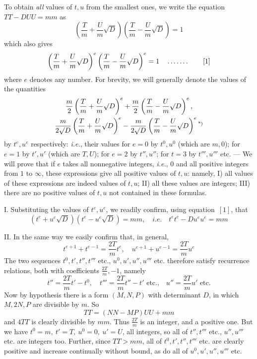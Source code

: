 To obtain \textit{all} values of \(t,u\) from the smallest ones, we write the equation \(TT-DUU=mm\) as
\[
\left(\frac{T}{m}+\frac{U}{m}\surd D\right)\left(\frac{T}{m}-\frac{U}{m}\surd D\right)=1
\]
which also gives
\[
\left(\frac{T}{m}+\frac{U}{m}\surd D\right)^e\left(\frac{T}{m}-\frac{U}{m}\surd D\right)^e=1\quad\mathinner{\ldotp\ldotp\ldotp\ldotp\ldotp\ldotp\ldotp}\tag*{[1]}
\]
where \(e\) denotes any number. For brevity, we will generally denote the values of the quantities
\begingroup{}
\[
\begin{gathered}\frac{m}{2}\left(\frac{T}{m}+\frac{U}{m}\surd D\right)^e+\frac{m}{2}\left(\frac{T}{m}-\frac{U}{m}\surd D\right)^e,\\
\frac{m}{2\surd D}\left(\frac{T}{m}+\frac{U}{m}\surd D\right)^e-\frac{m}{2\surd D}\left(\frac{T}{m}-\frac{U}{m}\surd D\right)^e\text{\textsuperscript{*)}}\end{gathered}
\]
\endgroup
by \(t^e,u^e\) respectively: \textit{i.e.}, their values for \(e=0\) by \(t^0,u^0\) (which are \(m,0\)); for \(e=1\) by \(t',u'\) (which are \(T,U\)); for \(e=2\) by \(t'',u''\); for \(t=3\) by \(t''',u'''\) etc. --- We will prove that if \(e\) takes all nonnegative integers, \textit{i.e.}, \(0\) and all positive integers from \(1\) to \(\infty\), these expressions give all positive values of \(t,u\): namely, I) all values of these expressions
are indeed values of \(t,u\); II) all these values are integers; III) there are no positive values of \(t,u\) not contained in these formulas.

I. Substituting the values of \(t^e,u^e\), we readily confirm, using equation~\([1]\), that
\[
(t^e+u^e\surd D)(t^e-u^e\surd D)=mm,\quad \textit{i.e.}\quad t^e t^e-Du^e u^e=mm
\]

II. In the same way we easily confirm that, in general,
\[
t^{e+1}+t^{e-1}=\frac{2T}{m}t^e,\quad u^{e+1}+u^{e-1}=\frac{2T}{m}u^e
\]
The two sequences \(t^0,t',t'',t'''\) etc., \(u^0,u',u'',u'''\) etc. therefore satisfy recurrence relations, both with coefficients \(\frac{2T}{m},-1\), namely
\[
t''=\frac{2T}{m}t'-t^0,\quad t'''=\frac{2T}{m}t''-t'\text{ etc.,}\quad u''=\frac{2T}{m}u'\text{ etc.}
\]
Now by hypothesis there is a form \((M,N,P)\) with determinant \(D\), in which \(M,2N,P\) are divisible by \(m\). So
\[
TT=(NN-MP)UU+mm
\]
and \(4TT\) is clearly divisible by \(mm\). Thus \(\frac{2T}{m}\) is an integer, and a positive one. But we have \(t^0=m,\ t'=T,\ u^0=0,\ u'=U\), all integers, so all of \(t'',t'''\) etc., \(u'',u'''\) etc. are integers too. Further, since \(TT>mm\), all of \(t^0,t',t'',t'''\) etc. are clearly positive and increase continually without bound, as do all of \(u^0,u',u'',u'''\) etc.

